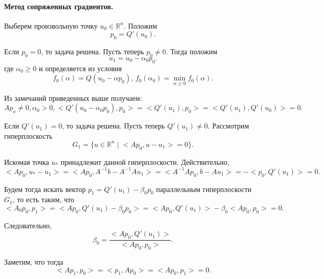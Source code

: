 \paragraph{Метод сопряженных градиентов. } Выберем произвольную точку $u_0 \in \mathbb{R}^n$. Положим
\begin{equation*}
	p_0 = Q'(u_0).
\end{equation*}

Если $p_0 = 0$, то задача решена. Пусть теперь $p_0 \not = 0$. Тогда положим 
\begin{equation*}
	u_1 = u_0 - \alpha_0 p_0.
\end{equation*}
где $\alpha_0 \geqslant 0$ и определяется из условия 
\begin{equation*}
	f_0(\alpha) = Q(u_0 - \alpha p_0), \, f_0(\alpha_0) = \min_{\alpha \geqslant 0} f_0(\alpha).
\end{equation*}

Из замечаний приведенных выше получаем:
\begin{equation*}
	A p_o \not = 0, \alpha_0 > 0, \big<Q'(u_0 - \alpha_0 p_0), p_0\big> = \big<Q'(u_1), p_0\big> = \big<Q'(u_1), Q'(u_0)\big> = 0.
\end{equation*}

Если $Q'(u_1) = 0$, то задача решена. Пусть теперь $Q'(u_1) \not = 0$. Рассмотрим гиперплоскость 
\begin{equation*}
	G_1= \{u \in \mathbb{R}^n \mid \big<A p_0, u - u_1\big> = 0\}.
\end{equation*}

Искомая точка $u_{\ast}$ принадлежит данной гиперплоскости. Действительно,
\begin{equation*}
	\big<A p_0, u_{\ast} - u_1\big> = \big<A p_0, A^{-1} b - A^{-1} A u_1\big> = \big<A^{-1} A p_0, b - A u_1\big> = -\big<p_0, Q'(u_1)\big> = 0.
\end{equation*}

Будем тогда искать вектор $p_1 = Q'(u_1) - \beta_0 p_0$ параллельным гиперплоскости $G_1$, то есть таким, что 
\begin{equation*}
	\big<A_0 p_0, p_1\big> = \big<A p_0, Q'(u_1) - \beta_0 p_0\big> = \big<A p_0, Q'(u_1)\big> - \beta_0 \big<A p_0, p_0\big> = 0.
\end{equation*}

Следовательно, 
\begin{equation*}
	\beta_0 = \frac{\big<A p_0, Q'(u_1)\big>}{\big<A p_0, p_0\big>}.
\end{equation*}

Заметим, что тогда 
\begin{equation*}
	\big<A p_1, p_0\big> = \big<p_1, A p_0\big> = \big<A p_0, p_1\big> = 0.
\end{equation*}

